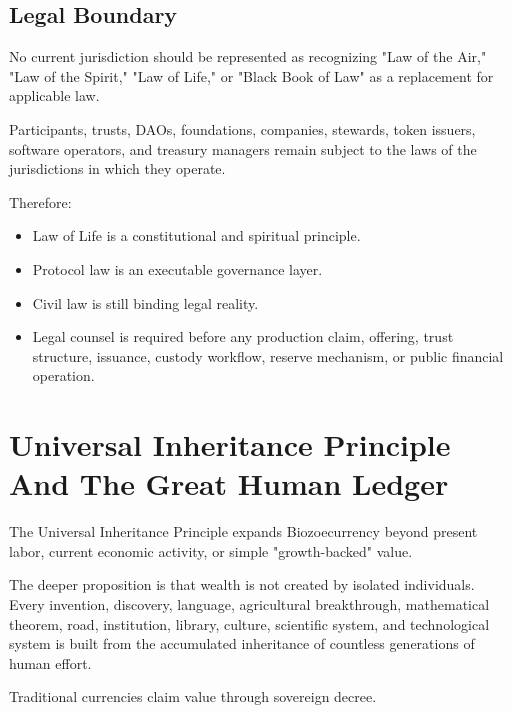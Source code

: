 ﻿\documentclass[12pt]{article}
\begin{document}
\subsection{Legal Boundary}


No current jurisdiction should be represented as recognizing "Law of the Air," "Law of the Spirit," "Law of Life," or "Black Book of Law" as a replacement for applicable law.

Participants, trusts, DAOs, foundations, companies, stewards, token issuers, software operators, and treasury managers remain subject to the laws of the jurisdictions in which they operate.

Therefore:

\begin{itemize}
  \item Law of Life is a constitutional and spiritual principle.
\end{itemize}
\begin{itemize}
  \item Protocol law is an executable governance layer.
\end{itemize}
\begin{itemize}
  \item Civil law is still binding legal reality.
\end{itemize}
\begin{itemize}
  \item Legal counsel is required before any production claim, offering, trust structure, issuance, custody workflow, reserve mechanism, or public financial operation.
\end{itemize}

\section{Universal Inheritance Principle And The Great Human Ledger}


The Universal Inheritance Principle expands Biozoecurrency beyond present labor, current economic activity, or simple "growth-backed" value.

The deeper proposition is that wealth is not created by isolated individuals. Every invention, discovery, language, agricultural breakthrough, mathematical theorem, road, institution, library, culture, scientific system, and technological system is built from the accumulated inheritance of countless generations of human effort.

Traditional currencies claim value through sovereign decree.
\end{document}
